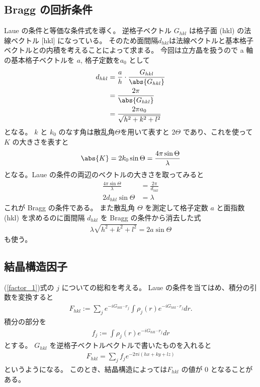 \documentclass[11pt,dvipdfmx,a4paper]{jsarticle}
\begin{document}
\subsection{Bragg の回折条件}
 Laue の条件と等価な条件式を導く。
逆格子ベクトル \(G_{hkl}\) は格子面 (hkl) の法線ベクトル [hkl] になっている。
そのため面間隔\(d_{hkl}\)は法線ベクトルと基本格子ベクトルとの内積を考えることによって求まる。
今回は立方晶を扱うので a 軸の基本格子ベクトルを \(a\), 格子定数を\(a_0\) として
\begin{align}
	d_{hkl} &= \frac{a}{h} \cdot \frac{G_{hkl}}{\abs{G_{hkl}}}\\
	&= \frac{2\pi}{\abs{G_{hkl}}} \label{eq:d-G}\\
	&= \frac{2\pi a_0}{\sqrt{h^2+k^2+l^2}}
\end{align}
となる。
\(k\) と \(k_0\) のなす角は散乱角\(\Theta\)を用いて表すと \(2\Theta\) であり、これを使って \(K\) の大きさを表すと
\begin{align}
	\abs{K} = 2k_0\sin\Theta = \frac{4\pi\sin\Theta}{\lambda}
\end{align}
となる。Laue の条件の両辺のベクトルの大きさを取ってみると
\begin{align}
	\frac{4\pi\sin\Theta}{\lambda} &= \frac{2\pi}{d_{hkl}}\\
	2d_{hkl} \sin\Theta &= \lambda
\end{align}
これが Bragg の条件である。
また散乱角 \(\Theta\) を測定して格子定数 \(a\) と面指数 (hkl) を求めるのに面間隔 \(d_{hkl}\) を Bragg の条件から消去した式
\begin{align}
	\lambda \sqrt{h^2+k^2+l^2}  = 2a \sin\Theta \label{eq:bragg}
\end{align}
も使う。

\subsection{結晶構造因子}
(\ref{factor_1})式の \(j\) についての総和を考える。
Laue の条件を当てはめ、積分の引数を変換すると
\begin{align}
	F_{hkl} := \sum_j e^{-iG_{hkl}\cdot r_j} \int \rho_j(r) e^{-iG_{hkl}\cdot r_j}dr .
\end{align}
積分の部分を
\begin{align}
	f_j :=\int \rho_j(r) e^{-iG_{hkl}\cdot r_j}dr
\end{align}
とする。
\(G_{hkl}\) を逆格子ベクトルベクトルで書いたものを入れると
\begin{align}
	F_{hkl} = \sum_j f_j e^{-2\pi i (hx + ky + lz)}
\end{align}
というようになる。
このとき、結晶構造によっては\(F_{hkl}\) の値が 0 となることがある。
\end{document}
